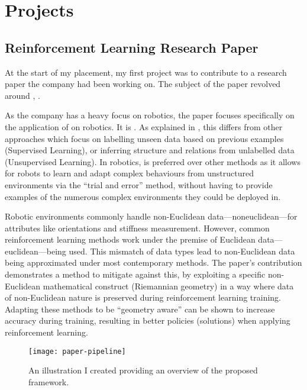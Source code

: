 \chapter{Projects}
\glsresetall

\section{Reinforcement Learning Research Paper}

At the start of my placement, my first project was to contribute to a research paper the company had
been working on. The subject of the paper revolved around , .

As the company has a heavy focus on robotics, the paper focuses specifically on the application of
 on robotics. It is . As explained in \textcite{sutton2018reinforcement}, this
differs from other  approaches which focus on labelling unseen data based on previous
examples (Supervised Learning), or inferring structure and relations from unlabelled data
(Unsupervised Learning). In robotics,  is preferred over other  methods as it
allows for robots to learn and adapt complex behaviours from unstructured environments via the
\enquote{trial and error} method, without having to provide examples of the numerous complex
environments they could be deployed in.

Robotic environments commonly handle non-Euclidean data---\glsdesc*{noneuclidean}---for attributes
like orientations and stiffness measurement. However, common reinforcement learning methods work
under the premise of Euclidean data---\glsdesc*{euclidean}---being used. This mismatch of data types
lead to non-Euclidean data being approximated under most contemporary methods. The paper's
contribution demonstrates a method to mitigate against this, by exploiting a specific non-Euclidean
mathematical construct (Riemannian geometry) in a way where data of non-Euclidean nature is
preserved during reinforcement learning training. Adapting these methods to be \enquote{geometry
    aware} can be shown to increase accuracy during training, resulting in better policies (solutions)
when applying reinforcement learning.

\begin{figure}
    \centering
    \texttt{[image: paper-pipeline]}
    \caption{An illustration I created providing an overview of the proposed
        framework.\label{fig:paper-framework}}
\end{figure}

